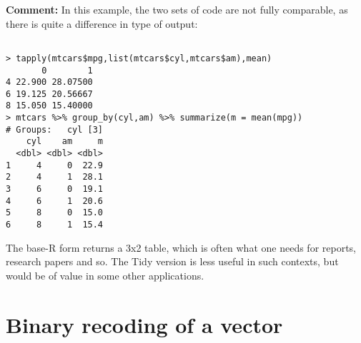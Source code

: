 \documentclass[11pt]{article}
\begin{document}
\begin{parcolumns}[rulebetween=true]{2}


\hspace{0.1in}


\end{parcolumns}

\textbf{Comment:}  
In this example, the two sets of code are not fully comparable,
as there is quite a difference in type of output:

\begin{lstlisting}

> tapply(mtcars$mpg,list(mtcars$cyl,mtcars$am),mean)
       0        1
4 22.900 28.07500
6 19.125 20.56667
8 15.050 15.40000
> mtcars %>% group_by(cyl,am) %>% summarize(m = mean(mpg))
# Groups:   cyl [3]
    cyl    am     m
  <dbl> <dbl> <dbl>
1     4     0  22.9
2     4     1  28.1
3     6     0  19.1
4     6     1  20.6
5     8     0  15.0
6     8     1  15.4

\end{lstlisting}

The base-R form returns a 3x2 table, which is often what one needs for
reports, research papers and so.  The Tidy version is less useful in
such contexts, but would be of value in some other applications.

\section*{Binary recoding of a vector}
\end{document}
